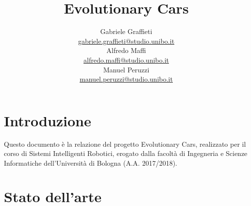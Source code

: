 \documentclass[a4paper,12pt]{article}
\title{\vspace{-5em}\Huge \textbf{Evolutionary Cars}
}
\author{
	Gabriele Graffieti \\ \small \url{gabriele.graffieti@studio.unibo.it}
	\vspace{15pt}
	\\
	Alfredo Maffi \\ \small \url{alfredo.maffi@studio.unibo.it}
	\vspace{15pt}
	\\
	Manuel Peruzzi \\ \small \url{manuel.peruzzi@studio.unibo.it}
}
\date{}
\begin{document}
\maketitle
{}
\tableofcontents
\newpage

\section{Introduzione}

Questo documento è la relazione del progetto Evolutionary Cars, realizzato per il corso di Sistemi Intelligenti Robotici, erogato dalla facoltà di Ingegneria e Scienze Informatiche dell'Università di Bologna (A.A. 2017/2018).

\section{Stato dell'arte}
\end{document}
